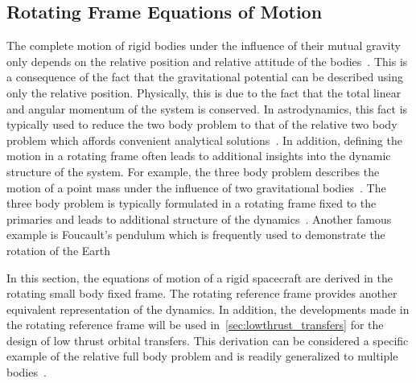 \subsection{Rotating Frame Equations of Motion}\label{sec:asteroid_dumbbell_eoms}
The complete motion of rigid bodies under the influence of their mutual gravity only depends on the relative position and relative attitude of the bodies~\cite{lee2007a}.
This is a consequence of the fact that the gravitational potential can be described using only the relative position.
Physically, this is due to the fact that the total linear and angular momentum of the system is conserved.
In astrodynamics, this fact is typically used to reduce the two body problem to that of the relative two body problem which affords convenient analytical solutions~\cite{vallado2007,bate1971}.
In addition, defining the motion in a rotating frame often leads to additional insights into the dynamic structure of the system.
For example, the three body problem describes the motion of a point mass under the influence of two gravitational bodies~\cite{szebehely1967}.
The three body problem is typically formulated in a rotating frame fixed to the primaries and leads to additional structure of the dynamics~\cite{koon2011}.
Another famous example is Foucault's pendulum which is frequently used to demonstrate the rotation of the Earth

In this section, the equations of motion of a rigid spacecraft are derived in the rotating small body fixed frame.
The rotating reference frame provides another equivalent representation of the dynamics.
In addition, the developments made in the rotating reference frame will be used in~\cref{sec:lowthrust_transfers} for the design of low thrust orbital transfers.
This derivation can be considered a specific example of the relative full body problem and is readily generalized to multiple bodies~\cite{lee2007a}.

